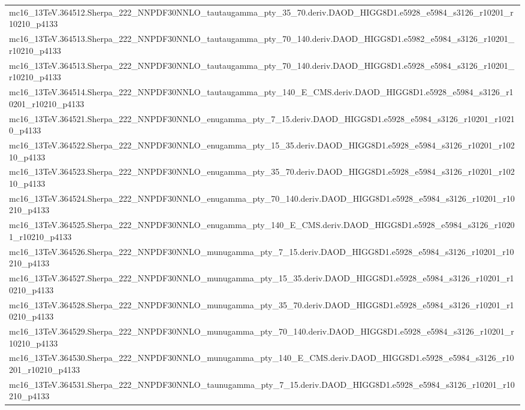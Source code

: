 \begin{adjustwidth}{-3em}{-3em}
\begin{longtable}{l}
mc16\_13TeV.364512.Sherpa\_222\_NNPDF30NNLO\_tautaugamma\_pty\_35\_70.deriv.DAOD\_HIGG8D1.e5928\_e5984\_s3126\_r10201\_r10210\_p4133 \\
mc16\_13TeV.364513.Sherpa\_222\_NNPDF30NNLO\_tautaugamma\_pty\_70\_140.deriv.DAOD\_HIGG8D1.e5982\_e5984\_s3126\_r10201\_r10210\_p4133 \\
mc16\_13TeV.364513.Sherpa\_222\_NNPDF30NNLO\_tautaugamma\_pty\_70\_140.deriv.DAOD\_HIGG8D1.e5928\_e5984\_s3126\_r10201\_r10210\_p4133 \\
mc16\_13TeV.364514.Sherpa\_222\_NNPDF30NNLO\_tautaugamma\_pty\_140\_E\_CMS.deriv.DAOD\_HIGG8D1.e5928\_e5984\_s3126\_r10201\_r10210\_p4133 \\
mc16\_13TeV.364521.Sherpa\_222\_NNPDF30NNLO\_enugamma\_pty\_7\_15.deriv.DAOD\_HIGG8D1.e5928\_e5984\_s3126\_r10201\_r10210\_p4133 \\
mc16\_13TeV.364522.Sherpa\_222\_NNPDF30NNLO\_enugamma\_pty\_15\_35.deriv.DAOD\_HIGG8D1.e5928\_e5984\_s3126\_r10201\_r10210\_p4133 \\
mc16\_13TeV.364523.Sherpa\_222\_NNPDF30NNLO\_enugamma\_pty\_35\_70.deriv.DAOD\_HIGG8D1.e5928\_e5984\_s3126\_r10201\_r10210\_p4133 \\
mc16\_13TeV.364524.Sherpa\_222\_NNPDF30NNLO\_enugamma\_pty\_70\_140.deriv.DAOD\_HIGG8D1.e5928\_e5984\_s3126\_r10201\_r10210\_p4133 \\
mc16\_13TeV.364525.Sherpa\_222\_NNPDF30NNLO\_enugamma\_pty\_140\_E\_CMS.deriv.DAOD\_HIGG8D1.e5928\_e5984\_s3126\_r10201\_r10210\_p4133 \\
mc16\_13TeV.364526.Sherpa\_222\_NNPDF30NNLO\_munugamma\_pty\_7\_15.deriv.DAOD\_HIGG8D1.e5928\_e5984\_s3126\_r10201\_r10210\_p4133 \\
mc16\_13TeV.364527.Sherpa\_222\_NNPDF30NNLO\_munugamma\_pty\_15\_35.deriv.DAOD\_HIGG8D1.e5928\_e5984\_s3126\_r10201\_r10210\_p4133 \\
mc16\_13TeV.364528.Sherpa\_222\_NNPDF30NNLO\_munugamma\_pty\_35\_70.deriv.DAOD\_HIGG8D1.e5928\_e5984\_s3126\_r10201\_r10210\_p4133 \\
mc16\_13TeV.364529.Sherpa\_222\_NNPDF30NNLO\_munugamma\_pty\_70\_140.deriv.DAOD\_HIGG8D1.e5928\_e5984\_s3126\_r10201\_r10210\_p4133 \\
mc16\_13TeV.364530.Sherpa\_222\_NNPDF30NNLO\_munugamma\_pty\_140\_E\_CMS.deriv.DAOD\_HIGG8D1.e5928\_e5984\_s3126\_r10201\_r10210\_p4133 \\
mc16\_13TeV.364531.Sherpa\_222\_NNPDF30NNLO\_taunugamma\_pty\_7\_15.deriv.DAOD\_HIGG8D1.e5928\_e5984\_s3126\_r10201\_r10210\_p4133 \\

\end{longtable}
\end{adjustwidth}
